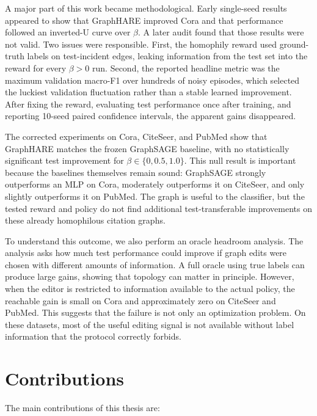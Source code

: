 A major part of this work became methodological. Early single-seed results appeared to show
that GraphHARE improved Cora and that performance followed an inverted-U curve over $\beta$.
A later audit found that those results were not valid. Two issues were responsible. First,
the homophily reward used ground-truth labels on test-incident edges, leaking information
from the test set into the reward for every $\beta > 0$ run. Second, the reported headline
metric was the maximum validation macro-F1 over hundreds of noisy episodes, which selected
the luckiest validation fluctuation rather than a stable learned improvement. After fixing
the reward, evaluating test performance once after training, and reporting 10-seed paired
confidence intervals, the apparent gains disappeared.

The corrected experiments on Cora, CiteSeer, and PubMed show that GraphHARE matches the
frozen GraphSAGE baseline, with no statistically significant test improvement for
$\beta \in \{0, 0.5, 1.0\}$. This null result is important because the baselines themselves
remain sound: GraphSAGE strongly outperforms an MLP on Cora, moderately outperforms it on
CiteSeer, and only slightly outperforms it on PubMed. The graph is useful to the classifier,
but the tested reward and policy do not find additional test-transferable improvements on
these already homophilous citation graphs.

To understand this outcome, we also perform an oracle headroom analysis. The analysis asks
how much test performance could improve if graph edits were chosen with different amounts of
information. A full oracle using true labels can produce large gains, showing that topology
can matter in principle. However, when the editor is restricted to information available to
the actual policy, the reachable gain is small on Cora and approximately zero on CiteSeer
and PubMed. This suggests that the failure is not only an optimization problem. On these
datasets, most of the useful editing signal is not available without label information that
the protocol correctly forbids.

\section*{Contributions}

The main contributions of this thesis are:

